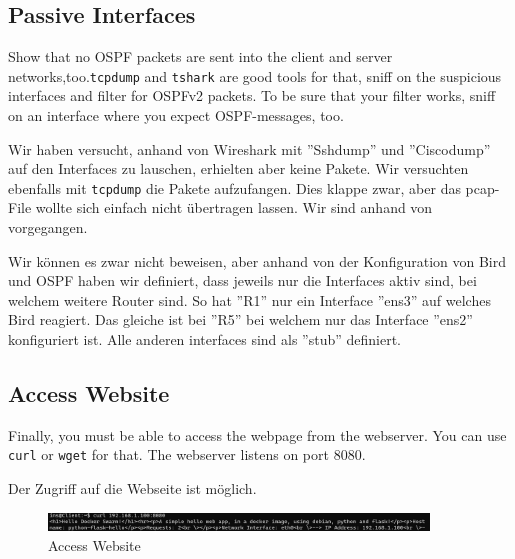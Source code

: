 \documentclass[11pt,titlepage]{article}
\newenvironment{shadedquotation}
 {\begin{shaded*}
  \quoting[leftmargin=0pt, vskip=0pt]
 }
 {\endquoting
 \end{shaded*}
}
\begin{document}
\subsection{Passive Interfaces}
\label{subsec:PassiveInterfaces}
\begin{shadedquotation}
  Show that no OSPF packets are sent into the client and server networks,too.\lstinline!tcpdump! and \lstinline!tshark! are good tools for that, sniff on the suspicious interfaces and filter for OSPFv2 packets. To be sure that your filter works, sniff on an interface where you expect OSPF-messages, too.
\end{shadedquotation}

Wir haben versucht, anhand von Wireshark mit ''Sshdump'' und ''Ciscodump'' auf den Interfaces zu lauschen, erhielten aber keine Pakete.
Wir versuchten ebenfalls mit \lstinline!tcpdump! die Pakete aufzufangen. Dies klappe zwar, aber das pcap-File wollte sich einfach nicht übertragen lassen. Wir sind anhand von \cite{TCPDUMP} vorgegangen.

\medskip

Wir können es zwar nicht beweisen, aber anhand von der Konfiguration von Bird und OSPF haben wir definiert, dass jeweils nur die Interfaces aktiv sind, bei welchem weitere Router sind. So hat ''R1'' nur ein Interface ''ens3'' auf welches Bird reagiert. Das gleiche ist bei ''R5'' bei welchem nur das Interface ''ens2'' konfiguriert ist. Alle anderen interfaces sind als ''stub'' definiert.

\subsection{Access Website}
\label{subsec:AccessWebsite}
\begin{shadedquotation}
  Finally, you must be able to access the webpage from the webserver. You can use \lstinline!curl! or \lstinline!wget! for that. The webserver listens on port 8080.
\end{shadedquotation}
Der Zugriff auf die Webseite ist möglich.
\begin{figure}[H]
	\begin{center}
		\includegraphics[width=0.90\textwidth]{"images/Verifikation Access Website"}
		\caption{Access Website}
		\label{fig:verifikation-access-website}
	\end{center}
\end{figure}
\end{document}
